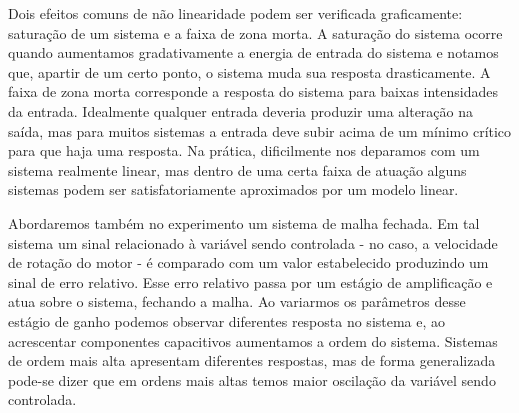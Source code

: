  Dois efeitos comuns de não linearidade podem ser verificada graficamente: saturação de um sistema e a faixa de zona morta. A saturação do sistema ocorre quando aumentamos gradativamente a energia de entrada do sistema e notamos que, apartir de um certo ponto, o sistema muda sua resposta drasticamente. A faixa de zona morta corresponde a resposta do sistema para baixas intensidades da entrada. Idealmente qualquer entrada deveria produzir uma alteração na saída, mas para muitos sistemas a entrada deve subir acima de um mínimo crítico para que haja uma resposta. Na prática, dificilmente nos deparamos com um sistema realmente linear, mas dentro de uma certa faixa de atuação alguns sistemas podem ser satisfatoriamente aproximados por um modelo linear.



Abordaremos também no experimento um sistema de malha fechada. Em tal sistema um sinal relacionado à variável sendo controlada - no caso, a velocidade de rotação do motor - 
é comparado com um valor estabelecido produzindo um sinal de erro relativo. Esse erro relativo passa por um estágio de amplificação e atua sobre o sistema, fechando a malha. 
Ao variarmos os parâmetros desse estágio de ganho podemos observar diferentes resposta no sistema e, ao acrescentar componentes
capacitivos aumentamos a ordem do sistema. Sistemas de ordem mais alta apresentam diferentes respostas, mas de forma generalizada pode-se dizer que em ordens mais altas temos maior oscilação da variável sendo controlada.




